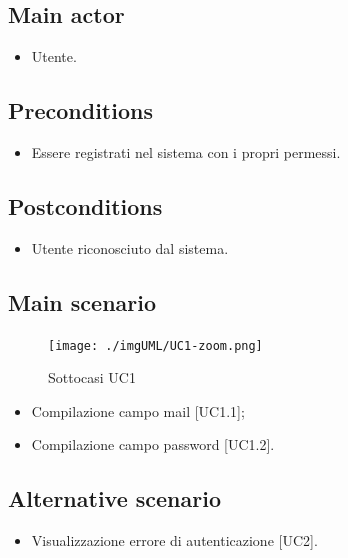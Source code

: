 \documentclass{article}
\begin{document}
     \subsection*{Main actor}
         \begin{itemize}
             \item Utente.
         \end{itemize}
     \subsection*{Preconditions} 
        \begin{itemize}
            \item Essere registrati nel sistema con i propri permessi.
        \end{itemize}
               
    \subsection*{Postconditions}
        \begin{itemize}
            \item Utente riconosciuto dal sistema.
        \end{itemize}
    \subsection*{Main scenario}
        \begin{figure}[h]
            \centering
            \texttt{[image: ./imgUML/UC1-zoom.png]}
            \caption{Sottocasi UC1}
            \label{fig:UC1_sottocasi}
        \end{figure}
            
        \begin{itemize}
            \item Compilazione campo mail [UC1.1];
            \item Compilazione campo password [UC1.2].
        \end{itemize}
            
        \subsection*{Alternative scenario}
            \begin{itemize}
                \item Visualizzazione errore di autenticazione [UC2].
            \end{itemize}
            
\end{document}
